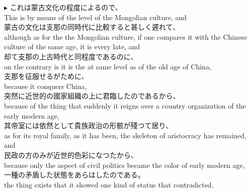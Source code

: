 \documentclass{ctexart}
\makeatletter
\newcommand*{\shifttext}[1]{%
  \settowidth{\@tempdima}{#1}%
  \hspace{-\@tempdima}#1%
}
\newcommand{\plabel}[1]{%
\shifttext{\textbf{#1}\quad}%
}
\makeatother
\begin{document}
\vspace{1em}
\plabel{$\blacktriangleright$}%
これは蒙古文化の程度によるので、\\
This is by means of the level of the Mongolian culture, and\\
蒙古の文化は支那の同時代に比較すると甚しく遲れて、\\
although as for the the Mongolian culture, if one compares it with the Chinese culture of the same age, it is every late, and\\
却て支那の上古時代と同程度であるのに、\\
on the contrary is it is the at same level as of the old age of China,\\
支那を征服せるがために、\\
because it conquers China,\\
突然に近世的の國家組織の上に君臨したのであるから、\\
because of the thing that suddenly it reigns over a country organization of the early modern age,\\
其帝室には依然として貴族政治の形骸が殘つて居り、\\
as for its royal family, as it has been, the skeleton of aristocracy has remained, and\\
民政の方のみが近世的色彩になつたから、\\
because only the aspect of civil politics became the color of early modern age,\\
一種の矛盾した状態をあらはしたのである。\\
the thing exists that it showed one kind of status that contradicted.
\end{document}
